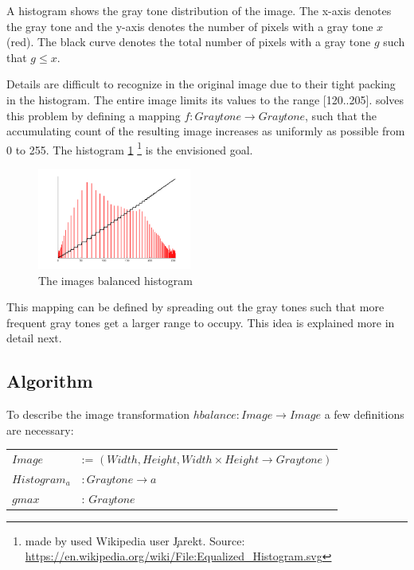     A histogram shows the gray tone distribution of the image.
    The x-axis denotes the gray tone and the y-axis denotes the
    number of pixels with a gray tone $x$ (red). The black curve denotes the
    total number of pixels with a gray tone $g$ such that $g \leq x$.

    Details are difficult to recognize in the original image
    due to their tight packing in the histogram. The
    entire image limits its values to the range [120..205].
    \algo solves this problem by defining a mapping
    $f: Graytone \rightarrow Graytone$, such that the accumulating count
    of the resulting image increases as uniformly as possible from 0 to 255.
    The histogram \ref{fig:hist-eq}
    \footnote{made by used Wikipedia user \c{Jarekt}. Source: \url{https://en.wikipedia.org/wiki/File:Equalized_Histogram.svg}}
    is the envisioned goal.
    
    \begin{figure}[h]
      \centering
      \includegraphics[width=0.45\textwidth]{hist-eq}
      \caption[Balanced Histogram]{The images balanced histogram}
      \label{fig:hist-eq}
    \end{figure}
    This mapping can be defined by spreading out the gray tones such that more
    frequent gray tones get a larger range to occupy. This idea is
    explained more in detail next.
  \subsection*{Algorithm}
    To describe the image transformation $ hbalance: Image \rightarrow Image$ a few definitions are necessary:
    
    \begin{table}[h!]
    \label{table:hbaldefs}
    \centering
    \begin{tabular}{ll}
      $Image$ & := $(Width,Height,Width \times Height \rightarrow Graytone)$ \\
      $Histogram_a$ & $: Graytone \rightarrow a$ \\
      $gmax$ & : $Graytone$ \\
    \end{tabular}
    \end{table}
    
